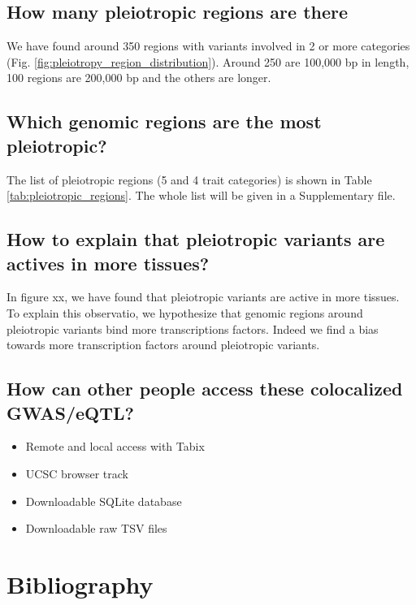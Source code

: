 \subsection*{How many pleiotropic regions are there}

We have found around 350 regions with variants involved in 2 or more categories (Fig. \ref{fig:pleiotropy_region_distribution}).
Around 250 are 100,000 bp in length, 100 regions are 200,000 bp and the others are longer.

\subsection*{Which genomic regions are the most pleiotropic?}

The list of pleiotropic regions (5 and 4 trait categories) is shown in Table \ref{tab:pleiotropic_regions}. The whole list will be given in a Supplementary file.


\subsection*{How to explain that pleiotropic variants are actives in more tissues?}

In figure xx, we have found that pleiotropic variants are active in more tissues.
To explain this observatio, we hypothesize that genomic regions around pleiotropic variants bind more transcriptions factors.
Indeed we find a bias towards more transcription factors around pleiotropic variants.

\subsection*{How can other people access these colocalized GWAS/eQTL?}

\begin{itemize}
  \item Remote and local access with Tabix
  \item UCSC browser track
  \item Downloadable SQLite database
  \item Downloadable raw TSV files
\end{itemize}

\section*{Bibliography}


